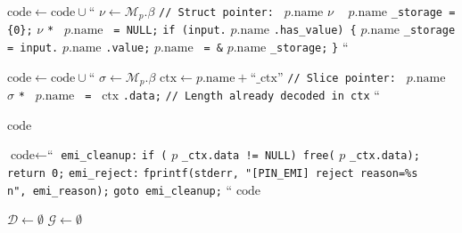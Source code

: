 \begin{algorithm}[H]
\begin{algorithmic}[1]
                \STATE $\text{code} \leftarrow \text{code} \cup \text{``}$
                \STATE \quad $\nu \leftarrow \mathcal{M}_p.\beta$ 
                \STATE \quad \texttt{// Struct pointer: } $p.\text{name}$
                \STATE \quad $\nu$ \texttt{ } $p.\text{name}$ \texttt{\_storage = \{0\};}
                \STATE \quad $\nu$ \texttt{* } $p.\text{name}$ \texttt{ = NULL;}
                \STATE \quad \texttt{if (input.} $p.\text{name}$ \texttt{.has\_value) \{}
                \STATE \quad \quad $p.\text{name}$ \texttt{\_storage = input.} $p.\text{name}$ \texttt{.value;}
                \STATE \quad \quad $p.\text{name}$ \texttt{ = \&} $p.\text{name}$ \texttt{\_storage;}
                \STATE \quad \texttt{\}}
                \STATE $\text{``}$

                \STATE $\text{code} \leftarrow \text{code} \cup \text{``}$
                \STATE \quad $\sigma \leftarrow \mathcal{M}_p.\beta$
                \STATE \quad $\text{ctx} \leftarrow p.\text{name} + \text{``\_ctx''}$
                \STATE \quad \texttt{// Slice pointer: } $p.\text{name}$
                \STATE \quad $\sigma$ \texttt{* } $p.\text{name}$ \texttt{ = } $\text{ctx}$ \texttt{.data;}
                \STATE \quad \texttt{// Length already decoded in ctx}
                \STATE $\text{``}$
            \ENDIF
        \ENDIF
    \ENDFOR

    \RETURN $\text{code}$
\ENDPROCEDURE

\vspace{0.3cm}

    \STATE $\text{code} \leftarrow \text{``}$
    \STATE \quad \texttt{emi\_cleanup:}
        \STATE \quad \texttt{if (} $p$ \texttt{\_ctx.data != NULL) free(} $p$ \texttt{\_ctx.data);}
    \ENDFOR
    \STATE \quad \texttt{return 0;}
    \STATE \quad
    \STATE \quad \texttt{emi\_reject:}
    \STATE \quad \texttt{fprintf(stderr, "[PIN\_EMI] reject reason=\%s\\n", emi\_reason);}
    \STATE \quad \texttt{goto emi\_cleanup;}
    \STATE $\text{``}$
    \RETURN $\text{code}$
\ENDPROCEDURE

\vspace{0.3cm}

    \STATE $\mathcal{D} \leftarrow \emptyset$ 
    \STATE $\mathcal{G} \leftarrow \emptyset$ 


\end{algorithmic}
\end{algorithm}
